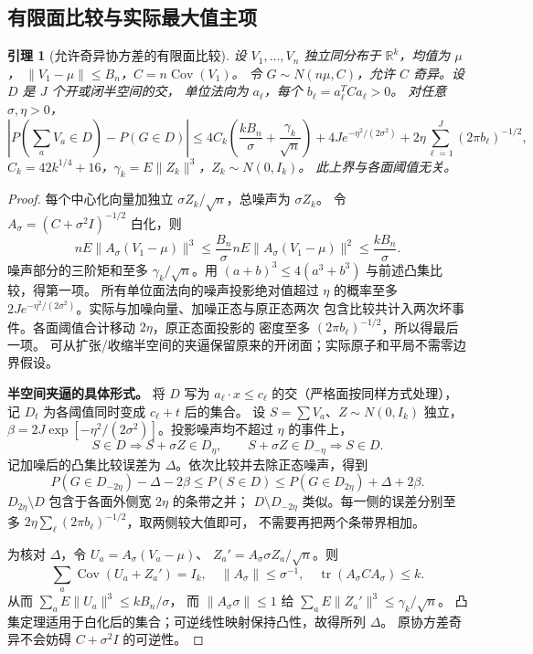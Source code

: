 \documentclass[UTF8,a4paper,11pt,fontset=fandol]{ctexart}
\newtheorem{lemma}{引理}[section]
\theoremstyle{remark}
\begin{document}
\subsection{有限面比较与实际最大值主项}
\begin{lemma}[允许奇异协方差的有限面比较]\label{lem:paperpolyface}
设 $V_1,\ldots,V_n$ 独立同分布于 $\mathbb R^k$，均值为 $\mu$，
$\|V_1-\mu\|\le B_n$，$C=n\operatorname{Cov}(V_1)$。
令 $G\sim N(n\mu,C)$，允许 $C$ 奇异。设 $D$ 是 $J$ 个开或闭半空间的交，
单位法向为 $a_\ell$，每个 $b_\ell=a_\ell^TCa_\ell>0$。
对任意 $\sigma,\eta>0$，
\[
 |P(\sum_aV_a\in D)-P(G\in D)|
 \le4C_k\left(\frac{kB_n}{\sigma}+\frac{\gamma_k}{\sqrt n}\right)
 +4Je^{-\eta^2/(2\sigma^2)}
 +2\eta\sum_{\ell=1}^J(2\pi b_\ell)^{-1/2},
\]
$C_k=42k^{1/4}+16$，$\gamma_k=E\|Z_k\|^3$，$Z_k\sim N(0,I_k)$。
此上界与各面阈值无关。
\end{lemma}
\begin{proof}
每个中心化向量加独立 $\sigma Z_k/\sqrt n$，总噪声为 $\sigma Z_k$。
令 $A_\sigma=(C+\sigma^2I)^{-1/2}$ 白化，则
\[
 nE\|A_\sigma(V_1-\mu)\|^3
 \le\frac{B_n}{\sigma}nE\|A_\sigma(V_1-\mu)\|^2
 \le\frac{kB_n}{\sigma}.
\]
噪声部分的三阶矩和至多 $\gamma_k/\sqrt n$。用 $(a+b)^3\le4(a^3+b^3)$
与前述凸集比较，得第一项。
所有单位面法向的噪声投影绝对值超过 $\eta$ 的概率至多
$2Je^{-\eta^2/(2\sigma^2)}$。实际与加噪向量、加噪正态与原正态两次
包含比较共计入两次坏事件。各面阈值合计移动 $2\eta$，原正态面投影的
密度至多 $(2\pi b_\ell)^{-1/2}$，所以得最后一项。
可从扩张/收缩半空间的夹逼保留原来的开闭面；实际原子和平局不需零边界假设。

\medskip\noindent\textbf{半空间夹逼的具体形式。}
将 $D$ 写为 $a_\ell\cdot x\le c_\ell$ 的交（严格面按同样方式处理），
记 $D_t$ 为各阈值同时变成 $c_\ell+t$ 后的集合。
设 $S=\sum V_a$、$Z\sim N(0,I_k)$ 独立，
$\beta=2J\exp[-\eta^2/(2\sigma^2)]$。投影噪声均不超过 $\eta$ 的事件上，
\[
 S\in D\Longrightarrow S+\sigma Z\in D_\eta,
 \qquad S+\sigma Z\in D_{-\eta}\Longrightarrow S\in D.
\]
记加噪后的凸集比较误差为 $\Delta$。依次比较并去除正态噪声，得到
\[
 P(G\in D_{-2\eta})-\Delta-2\beta
 \le P(S\in D)
 \le P(G\in D_{2\eta})+\Delta+2\beta.
\]
$D_{2\eta}\setminus D$ 包含于各面外侧宽 $2\eta$ 的条带之并；
$D\setminus D_{-2\eta}$ 类似。每一侧的误差分别至多
$2\eta\sum_\ell(2\pi b_\ell)^{-1/2}$，取两侧较大值即可，
不需要再把两个条带界相加。

为核对 $\Delta$，令 $U_a=A_\sigma(V_a-\mu)$、
$Z_a'=A_\sigma\sigma Z_a/\sqrt n$。则
\[
 \sum_a\operatorname{Cov}(U_a+Z_a')=I_k,\quad
 \|A_\sigma\|\le\sigma^{-1},\quad
 \operatorname{tr}(A_\sigma C A_\sigma)\le k.
\]
从而 $\sum_aE\|U_a\|^3\le kB_n/\sigma$，
而 $\|A_\sigma\sigma\|\le1$ 给
$\sum_aE\|Z_a'\|^3\le\gamma_k/\sqrt n$。
凸集定理适用于白化后的集合；可逆线性映射保持凸性，故得所列 $\Delta$。
原协方差奇异不会妨碍 $C+\sigma^2I$ 的可逆性。

\end{proof}
\end{document}
